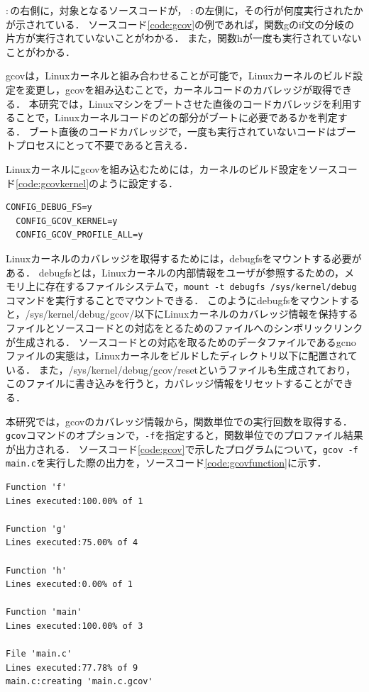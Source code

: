 \documentclass[graduation-thesis]{mlarticle}
\begin{document}
$:$の右側に，対象となるソースコードが，
$:$の左側に，その行が何度実行されたかが示されている．
ソースコード\ref{code:gcov}の例であれば，関数gのif文の分岐の片方が実行されていないことがわかる．
また，関数hが一度も実行されていないことがわかる．

gcovは，Linuxカーネルと組み合わせることが可能で，Linuxカーネルのビルド設定を変更し，gcovを組み込むことで，カーネルコードのカバレッジが取得できる．
本研究では，Linuxマシンをブートさせた直後のコードカバレッジを利用することで，Linuxカーネルコードのどの部分がブートに必要であるかを判定する．
ブート直後のコードカバレッジで，一度も実行されていないコードはブートプロセスにとって不要であると言える．

Linuxカーネルにgcovを組み込むためには，カーネルのビルド設定をソースコード\ref{code:gcovkernel}のように設定する．

\begin{lstlisting}[caption=gcovを組み込むLinuxカーネルの設定, label=code:gcovkernel]
  CONFIG_DEBUG_FS=y
  CONFIG_GCOV_KERNEL=y
  CONFIG_GCOV_PROFILE_ALL=y
\end{lstlisting}

Linuxカーネルのカバレッジを取得するためには，debugfsをマウントする必要がある．
debugfsとは，Linuxカーネルの内部情報をユーザが参照するための，メモリ上に存在するファイルシステムで，\texttt{mount -t debugfs /sys/kernel/debug}コマンドを実行することでマウントできる．
このようにdebugfsをマウントすると，/sys/kernel/debug/gcov/以下にLinuxカーネルのカバレッジ情報を保持するファイルとソースコードとの対応をとるためのファイルへのシンボリックリンクが生成される．
ソースコードとの対応を取るためのデータファイルであるgcnoファイルの実態は，Linuxカーネルをビルドしたディレクトリ以下に配置されている．
また，/sys/kernel/debug/gcov/resetというファイルも生成されており，このファイルに書き込みを行うと，カバレッジ情報をリセットすることができる．

本研究では，gcovのカバレッジ情報から，関数単位での実行回数を取得する．
\texttt{gcov}コマンドのオプションで，\texttt{-f}を指定すると，関数単位でのプロファイル結果が出力される．
ソースコード\ref{code:gcov}で示したプログラムについて，\texttt{gcov -f main.c}を実行した際の出力を，ソースコード\ref{code:gcovfunction}に示す．

\begin{lstlisting}[caption=関数単位でのプロファイル結果, label=code:gcovfunction]
% gcov -f main.c
Function 'f'
Lines executed:100.00% of 1

Function 'g'
Lines executed:75.00% of 4

Function 'h'
Lines executed:0.00% of 1

Function 'main'
Lines executed:100.00% of 3

File 'main.c'
Lines executed:77.78% of 9
main.c:creating 'main.c.gcov'
\end{lstlisting}
\end{document}
